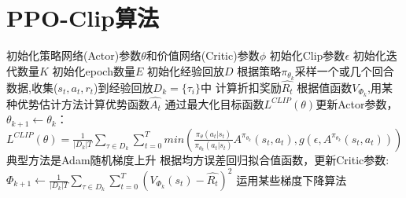\documentclass[11pt]{ctexart}
\begin{document}
\section{PPO-Clip算法}
\begin{algorithm}[H] %
	\renewcommand{\thealgorithm}{} %
	\caption{} 
	\begin{algorithmic}[1] %
		\STATE 初始化策略网络(Actor)参数$\theta$和价值网络(Critic)参数$\phi$
		\STATE 初始化Clip参数$\epsilon$
		\STATE 初始化迭代数量$K$
		\STATE 初始化epoch数量$E$
		\STATE 初始化经验回放$D$
			\STATE 根据策略$\pi_{\theta_k}$采样一个或几个回合数据,收集($s_t,a_t,r_t$)到经验回放$D_k=\{\tau_i\}$中
				\STATE 计算折扣奖励$\hat{R_t}$
				\STATE 根据值函数$V_{\Phi_k}$,用某种优势估计方法计算优势函数$\hat{A_t}$
				\STATE 通过最大化目标函数$L^{CLIP}(\theta)$更新Actor参数，$\theta_{k+1} \leftarrow \theta_{k}$：
				\STATE $L^{CLIP}(\theta)= \frac{1}{|D_k|T}\sum_{\tau \in D_k}\sum_{t=0}^{T} min(\frac{\pi_\theta(a_t|s_t)}{\pi_{\theta_{k}}(a_t|s_t)} A^{\pi_{\theta_{k}}}(s_t,a_t), g(\epsilon,A^{\pi_{\theta_{k}}}(s_t,a_t)))$\footnotemark[3]
				\STATE 典型方法是Adam随机梯度上升
				\STATE 根据均方误差回归拟合值函数，更新Critic参数:
				\STATE $\Phi_{k+1} \leftarrow \frac{1}{|D_k|T}\sum_{\tau \in D_k}\sum_{t=0}^{T} (V_{\Phi_{k}}(s_t)-\hat{R_t})^2$
				\STATE 运用某些梯度下降算法
			\ENDFOR
		\ENDFOR
	\end{algorithmic}
\end{algorithm}
\clearpage
\end{document}
